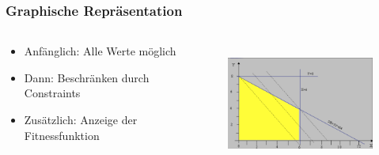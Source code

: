\documentclass[handout]{beamer}
\begin{document}
  \begin{frame}
    \frametitle{Graphische Repräsentation}
    \begin{columns}[onlytextwidth]
      \begin{column}{0.4\textwidth}
        \begin{itemize}[<+->]
          \item Anfänglich: Alle Werte möglich
          \item Dann: Beschränken durch Constraints
          \item Zusätzlich: Anzeige der Fitnessfunktion
        \end{itemize}
      \end{column}
      \begin{column}{0.6\textwidth}
        \begin{figure}
          \centering
          \includegraphics[width=\linewidth,height=150px,keepaspectratio]{optimization_graphic.png}
        \end{figure}
      \end{column}
    \end{columns}
  \end{frame}
\end{document}

